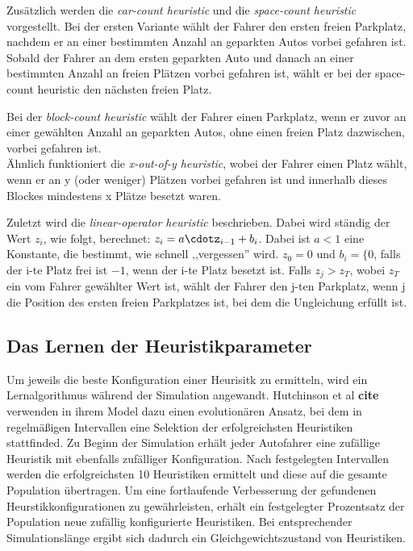 Zusätzlich werden die \emph{car-count heuristic} und die \emph{space-count heuristic} vorgestellt. Bei der ersten Variante wählt der Fahrer den ersten freien Parkplatz, nachdem er an einer bestimmten Anzahl an geparkten Autos vorbei gefahren ist. Sobald der Fahrer an dem ersten geparkten Auto und danach an einer bestimmten Anzahl an freien Plätzen vorbei gefahren ist, wählt er bei der space-count heuristic den nächsten freien Platz.

Bei der \emph{block-count heuristic} wählt der Fahrer einen Parkplatz, wenn er zuvor an einer gewählten Anzahl an geparkten Autos, ohne einen freien Platz dazwischen, vorbei gefahren ist.\\
Ähnlich funktioniert die \emph{x-out-of-y heuristic}, wobei der Fahrer einen Platz wählt, wenn er an y (oder weniger) Plätzen vorbei gefahren ist und innerhalb dieses Blockes mindestens x Plätze besetzt waren. 

Zuletzt wird die \emph{linear-operator heuristic} beschrieben. Dabei wird ständig der Wert $z_i$, wie folgt, berechnet: $z_i=a\cdotz_{i-1}+b_i$. Dabei ist $a<1$ eine Konstante, die bestimmt, wie schnell ,,vergessen'' wird. $z_0=0$ und $b_i=\lbrace 0$, falls der i-te Platz frei ist $-1$, wenn der i-te Platz besetzt ist. %
Falls $z_j>z_T$, wobei $z_T$ ein vom Fahrer gewählter Wert ist, wählt der Fahrer den j-ten Parkplatz, wenn j die Position des ersten freien Parkplatzes ist, bei dem die Ungleichung erfüllt ist. 

\subsection{Das Lernen der Heuristikparameter}
Um jeweils die beste Konfiguration einer Heurisitk zu ermitteln, wird ein Lernalgorithmus während der Simulation angewandt. Hutchinson et al \textbf{cite} verwenden in ihrem Model dazu einen evolutionären Ansatz, bei dem in regelmäßigen Intervallen eine Selektion der erfolgreichsten Heuristiken stattfinded. Zu Beginn der Simulation erhält jeder Autofahrer eine zufällige Heuristik mit ebenfalls zufälliger Konfiguration. Nach festgelegten Intervallen werden die erfolgreichsten 10 Heuristiken ermittelt und diese auf die gesamte Population übertragen. Um eine fortlaufende Verbesserung der gefundenen Heurstikkonfigurationen zu gewährleisten, erhält ein festgelegter Prozentsatz der Population neue zufällig konfigurierte Heuristiken. Bei entsprechender Simulationslänge ergibt sich dadurch ein Gleichgewichtszustand von Heuristiken. 

